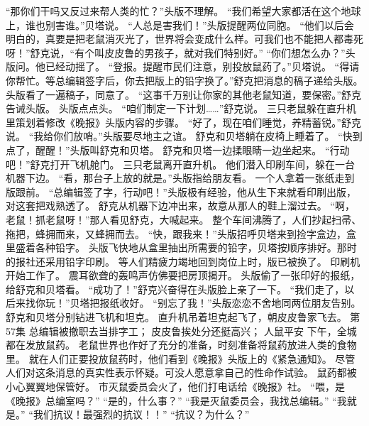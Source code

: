 \documentclass[a4paper,12pt,UTF8,twoside]{ctexbook}
\begin{document}
        “那你们干吗又反过来帮人类的忙？”头版不理解。 
        “我们希望大家都活在这个地球上，谁也别害谁。”贝塔说。 
        “人总是害我们！”头版提醒两位同胞。 
        “他们以后会明白的，真要是把老鼠消灭光了，世界将会变成什么样。可我们也不能把人都毒死呀！”舒克说，“有个叫皮皮鲁的男孩子，就对我们特别好。” 
        “你们想怎么办？”头版问。他已经动摇了。 
        “登报。提醒市民们注意，别投放鼠药了。”贝塔说。 
        “得请你帮忙。等总编辑签字后，你去把版上的铅字换了。”舒克把消息的稿子递给头版。 
        头版看了一遍稿子，同意了。 
        “这事千万别让你家的其他老鼠知道，要保密。”舒克告诫头版。 
        头版点点头。 
        “咱们制定一下计划……”舒克说。 
        三只老鼠躲在直升机里策划着修改《晚报》头版内容的步骤。 
        “好了，现在咱们睡觉，养精蓄锐。”舒克说。 
        “我给你们放哨。”头版要尽地主之谊。 
        舒克和贝塔躺在皮椅上睡着了。 
        “快到点了，醒醒！”头版叫舒克和贝塔。 
        舒克和贝塔一边揉眼睛一边坐起来。 
        “行动吧！”舒克打开飞机舱门。 
        三只老鼠离开直升机。 
        他们潜入印刷车间，躲在一台机器下边。 
        “看，那台子上放的就是。”头版指给朋友看。 
        一个人拿着一张纸走到版跟前。 
        “总编辑签了字，行动吧！”头版极有经验，他从生下来就看印刷出版，对这套把戏熟透了。 
        舒克从机器下边冲出来，故意从那人的鞋上溜过去。 
        “啊，老鼠！抓老鼠呀！”那人看见舒克，大喊起来。 
        整个车间沸腾了，人们抄起扫帚、拖把，蜂拥而来，又蜂拥而去。 
        “快，跟我来！”头版招呼贝塔来到捡字盒边，盒里盛着各种铅字。 
        头版飞快地从盒里抽出所需要的铅字，贝塔按顺序排好。那时的报社还采用铅字印刷。 
        等人们精疲力竭地回到岗位上时，版已被换了。 
        印刷机开始工作了。 
        震耳欲聋的轰鸣声仿佛要把房顶揭开。 
        头版偷了一张印好的报纸，给舒克和贝塔看。 
        “成功了！”舒克兴奋得在头版脸上亲了一下。 
        “我们走了，以后来找你玩！”贝塔把报纸收好。 
        “别忘了我！”头版恋恋不舍地同两位朋友告别。 
        舒克和贝塔分别钻进飞机和坦克。 
        直升机吊着坦克起飞了，朝皮皮鲁家飞去。   第57集 
        总编辑被撤职去当排字工； 
        皮皮鲁挨处分还挺高兴； 
        人鼠平安   
        下午，全城都在发放鼠药。 
        老鼠世界也作好了充分的准备，时刻准备将鼠药放进人类的食物里。 
        就在人们正要投放鼠药时，他们看到《晚报》头版上的《紧急通知》。 
        尽管人们对这条消息的真实性表示怀疑。可没人愿意拿自己的性命作试验。 
        鼠药都被小心翼翼地保管好。 
        市灭鼠委员会火了，他们打电话给《晚报》社。 
        “喂，是《晚报》总编室吗？” 
        “是的，什么事？” 
        “我是灭鼠委员会，我找总编辑。” 
        “我就是。” 
        “我们抗议！最强烈的抗议！！” 
        “抗议？为什么？” 
\end{document}

